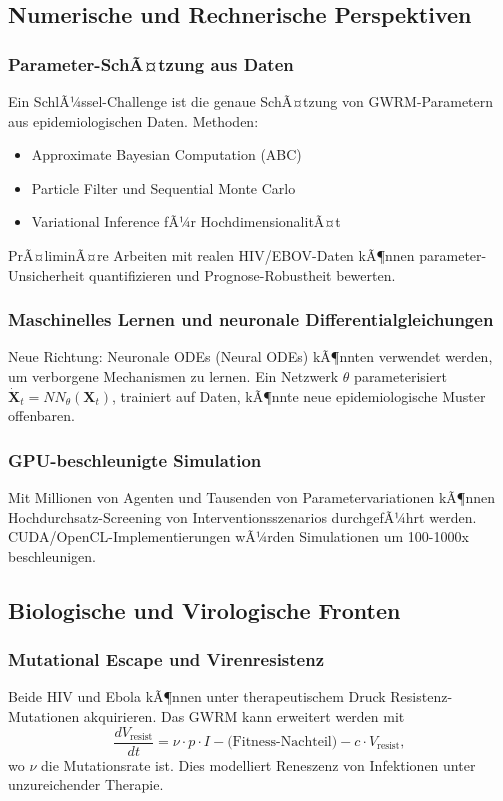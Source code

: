 ﻿\documentclass[a4paper,12pt]{article}
\theoremstyle{definition}
\begin{document}
\subsection{Numerische und Rechnerische Perspektiven}

\subsubsection{Parameter-SchÃ¤tzung aus Daten}
Ein SchlÃ¼ssel-Challenge ist die genaue SchÃ¤tzung von GWRM-Parametern aus epidemiologischen Daten. Methoden:
\begin{itemize}
\item Approximate Bayesian Computation (ABC)
\item Particle Filter und Sequential Monte Carlo
\item Variational Inference fÃ¼r HochdimensionalitÃ¤t
\end{itemize}

PrÃ¤liminÃ¤re Arbeiten mit realen HIV/EBOV-Daten kÃ¶nnen parameter-Unsicherheit quantifizieren und Prognose-Robustheit bewerten.

\subsubsection{Maschinelles Lernen und neuronale Differentialgleichungen}
Neue Richtung: Neuronale ODEs (Neural ODEs) kÃ¶nnten verwendet werden, um verborgene Mechanismen zu lernen. Ein Netzwerk $\theta$ parameterisiert $\dot{\mathbf{X}}_t = NN_\theta(\mathbf{X}_t)$, trainiert auf Daten, kÃ¶nnte neue epidemiologische Muster offenbaren.

\subsubsection{GPU-beschleunigte Simulation}
Mit Millionen von Agenten und Tausenden von Parametervariationen kÃ¶nnen Hochdurchsatz-Screening von Interventionsszenarios durchgefÃ¼hrt werden. CUDA/OpenCL-Implementierungen wÃ¼rden Simulationen um 100-1000x beschleunigen.

\subsection{Biologische und Virologische Fronten}

\subsubsection{Mutational Escape und Virenresistenz}
Beide HIV und Ebola kÃ¶nnen unter therapeutischem Druck Resistenz-Mutationen akquirieren. Das GWRM kann erweitert werden mit
\[
\frac{dV_{\text{resist}}}{dt} = \nu \cdot p \cdot I - \text{(Fitness-Nachteil)} - c \cdot V_{\text{resist}},
\]
wo $\nu$ die Mutationsrate ist. Dies modelliert Reneszenz von Infektionen unter unzureichender Therapie.
\end{document}
